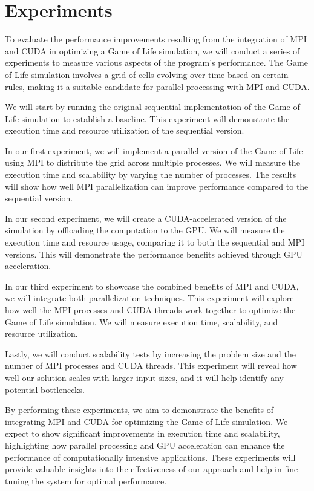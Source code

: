 \documentclass[11pt]{article}
\begin{document}
\section {Experiments}\label{exper}

To evaluate the performance improvements resulting from the integration of MPI and CUDA in optimizing a Game of Life simulation, we will conduct a series of experiments to measure various aspects of the program's performance. The Game of Life simulation involves a grid of cells evolving over time based on certain rules, making it a suitable candidate for parallel processing with MPI and CUDA.

We will start by running the original sequential implementation of the Game of Life simulation to establish a baseline. This experiment will demonstrate the execution time and resource utilization of the sequential version.

In our first experiment, we will implement a parallel version of the Game of Life using MPI to distribute the grid across multiple processes. We will measure the execution time and scalability by varying the number of processes. The results will show how well MPI parallelization can improve performance compared to the sequential version.

In our second experiment, we will create a CUDA-accelerated version of the simulation by offloading the computation to the GPU. We will measure the execution time and resource usage, comparing it to both the sequential and MPI versions. This will demonstrate the performance benefits achieved through GPU acceleration.

In our third experiment to showcase the combined benefits of MPI and CUDA, we will integrate both parallelization techniques. This experiment will explore how well the MPI processes and CUDA threads work together to optimize the Game of Life simulation. We will measure execution time, scalability, and resource utilization.

Lastly, we will conduct scalability tests by increasing the problem size and the number of MPI processes and CUDA threads. This experiment will reveal how well our solution scales with larger input sizes, and it will help identify any potential bottlenecks.

By performing these experiments, we aim to demonstrate the benefits of integrating MPI and CUDA for optimizing the Game of Life simulation. We expect to show significant improvements in execution time and scalability, highlighting how parallel processing and GPU acceleration can enhance the performance of computationally intensive applications. These experiments will provide valuable insights into the effectiveness of our approach and help in fine-tuning the system for optimal performance.
\end{document}
